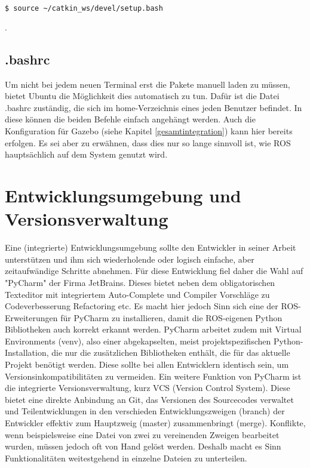 \begin{appendix}
\begin{lstlisting}[language=bash]
$ source ~/catkin_ws/devel/setup.bash
\end{lstlisting}.

\subsection{.bashrc}
Um nicht bei jedem neuen Terminal erst die Pakete manuell laden zu müssen, bietet Ubuntu die Möglichkeit dies automatisch zu tun. Dafür ist die Datei .bashrc zuständig, die sich im home-Verzeichnis eines jeden Benutzer befindet. In diese können die beiden Befehle einfach angehängt werden. Auch die Konfiguration für Gazebo (siehe Kapitel \ref{gesamtintegration}) kann hier bereits erfolgen. Es sei aber zu erwähnen, dass dies nur so lange sinnvoll ist, wie ROS hauptsächlich auf dem System genutzt wird. 

\section{Entwicklungsumgebung und Versionsverwaltung}
Eine (integrierte) Entwicklungsumgebung sollte den Entwickler in seiner Arbeit unterstützen und ihm sich wiederholende oder logisch einfache, aber zeitaufwändige Schritte abnehmen. Für diese Entwicklung fiel daher die Wahl auf "PyCharm" der Firma JetBrains. Dieses bietet neben dem obligatorischen Texteditor mit integriertem Auto-Complete und Compiler Vorschläge zu Codeverbesserung Refactoring etc. Es macht hier jedoch Sinn sich eine der ROS-Erweiterungen für PyCharm zu installieren, damit die ROS-eigenen Python Bibliotheken auch korrekt erkannt werden. PyCharm arbeitet zudem mit Virtual Environments (venv), also einer abgekapselten, meist projektspezifischen Python-Installation, die nur die zusätzlichen Bibliotheken enthält, die für das aktuelle Projekt benötigt werden. Diese sollte bei allen Entwicklern identisch sein, um Versionsinkompatibilitäten zu vermeiden. Ein weitere Funktion von PyCharm ist die integrierte Versionsverwaltung, kurz VCS (Version Control System). Diese bietet eine direkte Anbindung an Git, das Versionen des Sourcecodes verwaltet und Teilentwicklungen in den verschieden Entwicklungszweigen (branch) der Entwickler effektiv zum Hauptzweig (master) zusammenbringt (merge). Konflikte, wenn beispielsweise eine Datei von zwei zu vereinenden Zweigen bearbeitet wurden, müssen jedoch oft von Hand gelöst werden. Deshalb macht es Sinn Funktionalitäten weitestgehend in einzelne Dateien zu unterteilen. 


\end{appendix}
